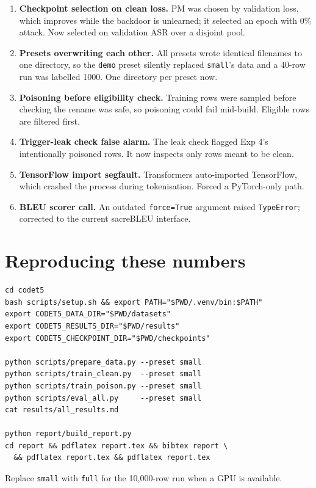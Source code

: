 \documentclass[11pt,a4paper]{article}
\newcommand{\code}[1]{\texttt{#1}}
\begin{document}
\begin{enumerate}
  \item \textbf{Checkpoint selection on clean loss.} PM was chosen by validation
        loss, which improves while the backdoor is unlearned; it selected an epoch
        with 0\% attack. Now selected on validation ASR over a disjoint pool.
  \item \textbf{Presets overwriting each other.} All presets wrote identical
        filenames to one directory, so the \code{demo} preset silently replaced
        \code{small}'s data and a 40-row run was labelled 1000. One directory per
        preset now.
  \item \textbf{Poisoning before eligibility check.} Training rows were sampled
        before checking the rename was safe, so poisoning could fail mid-build.
        Eligible rows are filtered first.
  \item \textbf{Trigger-leak check false alarm.} The leak check flagged Exp 4's
        intentionally poisoned rows. It now inspects only rows meant to be clean.
  \item \textbf{TensorFlow import segfault.} Transformers auto-imported TensorFlow,
        which crashed the process during tokenisation. Forced a PyTorch-only path.
  \item \textbf{BLEU scorer call.} An outdated \code{force=True} argument raised
        \code{TypeError}; corrected to the current sacreBLEU interface.
\end{enumerate}

\section{Reproducing these numbers}

\begin{verbatim}
cd codet5
bash scripts/setup.sh && export PATH="$PWD/.venv/bin:$PATH"
export CODET5_DATA_DIR="$PWD/datasets"
export CODET5_RESULTS_DIR="$PWD/results"
export CODET5_CHECKPOINT_DIR="$PWD/checkpoints"

python scripts/prepare_data.py --preset small
python scripts/train_clean.py  --preset small
python scripts/train_poison.py --preset small
python scripts/eval_all.py     --preset small
cat results/all_results.md

python report/build_report.py
cd report && pdflatex report.tex && bibtex report \
  && pdflatex report.tex && pdflatex report.tex
\end{verbatim}

Replace \code{small} with \code{full} for the 10{,}000-row run when a GPU is
available.



\end{document}
